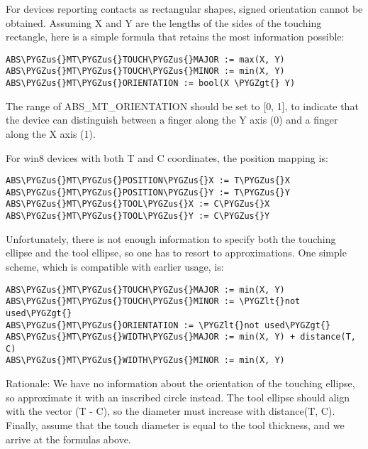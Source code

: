 \documentclass[a4paper,8pt,english]{sphinxmanual}
\def\PYGZus{\char`\_}
\def\PYGZlt{\char`\<}
\def\PYGZgt{\char`\>}
\begin{document}
For devices reporting contacts as rectangular shapes, signed orientation
cannot be obtained. Assuming X and Y are the lengths of the sides of the
touching rectangle, here is a simple formula that retains the most
information possible:

\begin{Verbatim}[commandchars=\\\{\}]
ABS\PYGZus{}MT\PYGZus{}TOUCH\PYGZus{}MAJOR := max(X, Y)
ABS\PYGZus{}MT\PYGZus{}TOUCH\PYGZus{}MINOR := min(X, Y)
ABS\PYGZus{}MT\PYGZus{}ORIENTATION := bool(X \PYGZgt{} Y)
\end{Verbatim}

The range of ABS\_MT\_ORIENTATION should be set to {[}0, 1{]}, to indicate that
the device can distinguish between a finger along the Y axis (0) and a
finger along the X axis (1).

For win8 devices with both T and C coordinates, the position mapping is:

\begin{Verbatim}[commandchars=\\\{\}]
ABS\PYGZus{}MT\PYGZus{}POSITION\PYGZus{}X := T\PYGZus{}X
ABS\PYGZus{}MT\PYGZus{}POSITION\PYGZus{}Y := T\PYGZus{}Y
ABS\PYGZus{}MT\PYGZus{}TOOL\PYGZus{}X := C\PYGZus{}X
ABS\PYGZus{}MT\PYGZus{}TOOL\PYGZus{}Y := C\PYGZus{}Y
\end{Verbatim}

Unfortunately, there is not enough information to specify both the touching
ellipse and the tool ellipse, so one has to resort to approximations.  One
simple scheme, which is compatible with earlier usage, is:

\begin{Verbatim}[commandchars=\\\{\}]
ABS\PYGZus{}MT\PYGZus{}TOUCH\PYGZus{}MAJOR := min(X, Y)
ABS\PYGZus{}MT\PYGZus{}TOUCH\PYGZus{}MINOR := \PYGZlt{}not used\PYGZgt{}
ABS\PYGZus{}MT\PYGZus{}ORIENTATION := \PYGZlt{}not used\PYGZgt{}
ABS\PYGZus{}MT\PYGZus{}WIDTH\PYGZus{}MAJOR := min(X, Y) + distance(T, C)
ABS\PYGZus{}MT\PYGZus{}WIDTH\PYGZus{}MINOR := min(X, Y)
\end{Verbatim}

Rationale: We have no information about the orientation of the touching
ellipse, so approximate it with an inscribed circle instead. The tool
ellipse should align with the vector (T - C), so the diameter must
increase with distance(T, C). Finally, assume that the touch diameter is
equal to the tool thickness, and we arrive at the formulas above.
\end{document}
